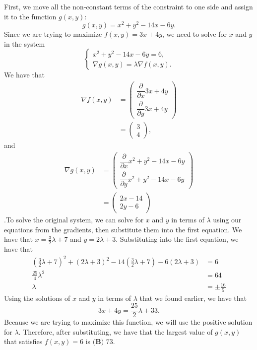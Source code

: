 \begin{enumerate}
First, we move all the non-constant terms of the constraint to one side and assign it to the function $g(x,y)$:
 \[g(x,y)=x^2+y^2-14x-6y.\]Since we are trying to maximize $f(x,y)=3x+4y$, we need to solve for $x$ and $y$ in the system
 \[\begin{cases}x^2+y^2-14x-6y=6,\\\nabla g(x,y)=\lambda\nabla f(x,y).\end{cases}\]We have that
 \begin{align*}\nabla f(x,y)&=\begin{pmatrix}\dfrac{\partial}{\partial x}3x+4y\\\dfrac{\partial}{\partial y}3x+4y\end{pmatrix}\\&=\begin{pmatrix}3\\4\end{pmatrix},\end{align*}
and
 \begin{align*}\nabla g(x,y)&=\begin{pmatrix}\dfrac{\partial}{\partial x}x^2+y^2-14x-6y\\\dfrac{\partial}{\partial y}x^2+y^2-14x-6y\end{pmatrix}\\&=\begin{pmatrix}2x-14\\2y-6\end{pmatrix}\end{align*}
.To solve the original system, we can solve for $x$ and $y$ in terms of $\lambda$ using our equations from the gradients, then substitute them into the first equation. We have that $x=\frac{3}{2}\lambda+7$ and $y=2\lambda+3$. Substituting into the first equation, we have that
 \begin{align*}\left(\frac{3}{2}\lambda+7\right)^2+(2\lambda+3)^2-14\left(\frac{3}{2}\lambda+7\right)-6(2\lambda+3)&=6\\\frac{25}{4}\lambda^2&=64\\\lambda&=\pm\frac{16}{5}\end{align*}
Using the solutions of $x$ and $y$ in terms of $\lambda$ that we found earlier, we have that
 \[3x+4y=\frac{25}{2}\lambda+33.\]Because we are trying to maximize this function, we will use the positive solution for $\lambda$. Therefore, after substituting, we have that the largest value of $g(x,y)$ that satisfies $f(x,y)=6$ is $\boxed{\textbf{(B) }73}$.

 




\end{enumerate}
